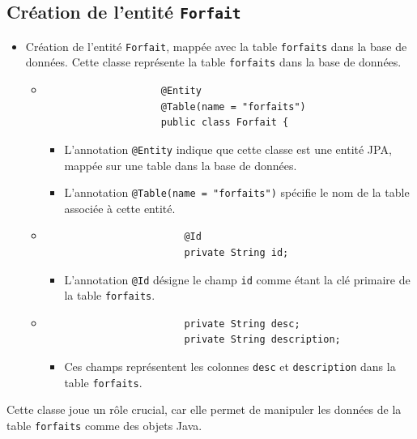 \documentclass[11pt]{article}
\begin{document}
		\subsection*{Création de l'entité \texttt{Forfait}}
		\begin{itemize}
			\item Création de l'entité \texttt{Forfait}, mappée avec la table \texttt{forfaits} dans la base de données. Cette classe représente la table \texttt{forfaits} dans la base de données. 	
			
			\begin{itemize}
				\item
				\begin{lstlisting}
					@Entity
					@Table(name = "forfaits")
					public class Forfait {
					\end{lstlisting}
					\begin{itemize}
						\item L'annotation \texttt{@Entity} indique que cette classe est une entité JPA, mappée sur une table dans la base de données.
						\item L'annotation \texttt{@Table(name = "forfaits")} spécifie le nom de la table associée à cette entité.
					\end{itemize}
					
					\item
					\begin{lstlisting}
						@Id
						private String id;
					\end{lstlisting}
					\begin{itemize}
						\item L'annotation \texttt{@Id} désigne le champ \texttt{id} comme étant la clé primaire de la table \texttt{forfaits}.
					\end{itemize}
					
					\item
					\begin{lstlisting}
						private String desc;
						private String description;
					\end{lstlisting}
					\begin{itemize}
						\item Ces champs représentent les colonnes \texttt{desc} et \texttt{description} dans la table \texttt{forfaits}.
					\end{itemize}
			\end{itemize}
		\end{itemize}
				
			
			Cette classe joue un rôle crucial, car elle permet de manipuler les données de la table \texttt{forfaits} comme des objets Java.
\end{document}
